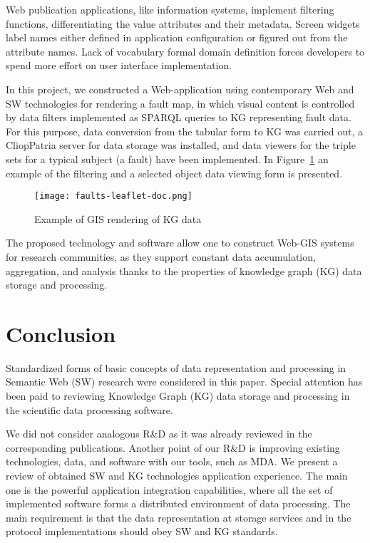 \documentclass[a4paper]{jctart19a}
\begin{document}
Web publication applications, like information systems, implement filtering functions, differentiating the value attributes and their metadata.  Screen widgets label names either defined in application configuration or figured out from the attribute names.  Lack of vocabulary formal domain definition forces developers to spend more effort on user interface implementation.

In this project, we constructed a Web-application using contemporary Web and SW technologies for rendering a fault map, in which visual content is controlled by data filters implemented as SPARQL queries to KG representing fault data.  For this purpose, data conversion from the tabular form to KG was carried out, a CliopPatria server for data storage was installed, and data viewers for the triple sets for a typical subject (a fault) have been implemented.  In Figure~\ref{fig:gis-ex} an example of the filtering and a selected object data viewing form is presented.
\begin{figure}[!b]
  \centering
  \texttt{[image: faults-leaflet-doc.png]}
  \caption{Example of GIS rendering of KG data}
  \label{fig:gis-ex}
\end{figure}

The proposed technology and software allow one to construct Web-GIS systems for research communities, as they support constant data accumulation, aggregation, and analysis thanks to the properties of knowledge graph (KG) data storage and processing.

\section*{Conclusion}
\label{sec:disc}

Standardized forms of basic concepts of data representation and processing in Semantic Web (SW) research were considered in this paper.  Special attention has been paid to reviewing Knowledge Graph (KG) data storage and processing in the scientific data processing software.

We did not consider analogous R\&D as it was already reviewed in the corresponding publications.  Another point of our R\&D is improving existing technologies, data, and software with our tools, such as MDA.  We present a review of obtained SW and KG technologies application experience.  The main one is the powerful application integration capabilities, where all the set of implemented software forms a distributed environment of data processing.  The main requirement is that the data representation at storage services and in the protocol implementations should obey SW and KG standards.
\end{document}
